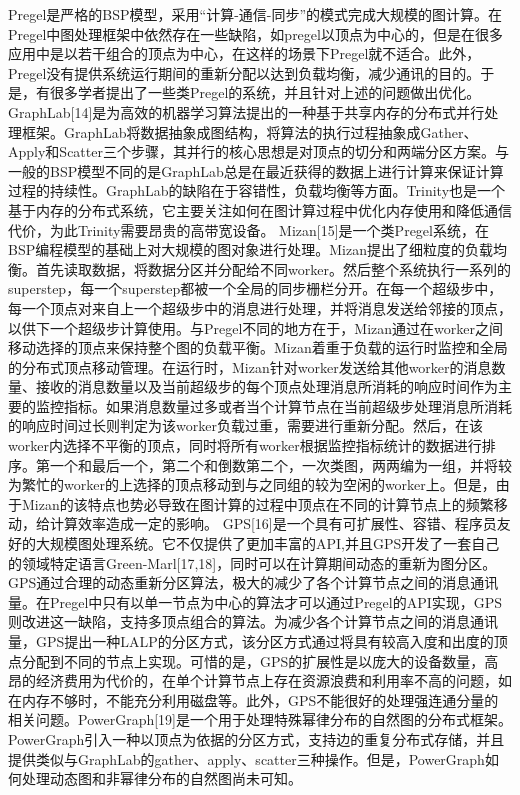Pregel是严格的BSP模型，采用“计算-通信-同步”的模式完成大规模的图计算。在Pregel中图处理框架中依然存在一些缺陷，如pregel以顶点为中心的，但是在很多应用中是以若干组合的顶点为中心，在这样的场景下Pregel就不适合。此外，Pregel没有提供系统运行期间的重新分配以达到负载均衡，减少通讯的目的。于是，有很多学者提出了一些类Pregel的系统，并且针对上述的问题做出优化。
GraphLab[14]是为高效的机器学习算法提出的一种基于共享内存的分布式并行处理框架。GraphLab将数据抽象成图结构，将算法的执行过程抽象成Gather、Apply和Scatter三个步骤，其并行的核心思想是对顶点的切分和两端分区方案。与一般的BSP模型不同的是GraphLab总是在最近获得的数据上进行计算来保证计算过程的持续性。GraphLab的缺陷在于容错性，负载均衡等方面。Trinity也是一个基于内存的分布式系统，它主要关注如何在图计算过程中优化内存使用和降低通信代价，为此Trinity需要昂贵的高带宽设备。
Mizan[15]是一个类Pregel系统，在BSP编程模型的基础上对大规模的图对象进行处理。Mizan提出了细粒度的负载均衡。首先读取数据，将数据分区并分配给不同worker。然后整个系统执行一系列的superstep，每一个superstep都被一个全局的同步栅栏分开。在每一个超级步中，每一个顶点对来自上一个超级步中的消息进行处理，并将消息发送给邻接的顶点，以供下一个超级步计算使用。与Pregel不同的地方在于，Mizan通过在worker之间移动选择的顶点来保持整个图的负载平衡。Mizan着重于负载的运行时监控和全局的分布式顶点移动管理。在运行时，Mizan针对worker发送给其他worker的消息数量、接收的消息数量以及当前超级步的每个顶点处理消息所消耗的响应时间作为主要的监控指标。如果消息数量过多或者当个计算节点在当前超级步处理消息所消耗的响应时间过长则判定为该worker负载过重，需要进行重新分配。然后，在该worker内选择不平衡的顶点，同时将所有worker根据监控指标统计的数据进行排序。第一个和最后一个，第二个和倒数第二个，一次类图，两两编为一组，并将较为繁忙的worker的上选择的顶点移动到与之同组的较为空闲的worker上。但是，由于Mizan的该特点也势必导致在图计算的过程中顶点在不同的计算节点上的频繁移动，给计算效率造成一定的影响。
GPS[16]是一个具有可扩展性、容错、程序员友好的大规模图处理系统。它不仅提供了更加丰富的API,并且GPS开发了一套自己的领域特定语言Green-Marl[17,18]，同时可以在计算期间动态的重新为图分区。GPS通过合理的动态重新分区算法，极大的减少了各个计算节点之间的消息通讯量。在Pregel中只有以单一节点为中心的算法才可以通过Pregel的API实现，GPS则改进这一缺陷，支持多顶点组合的算法。为减少各个计算节点之间的消息通讯量，GPS提出一种LALP的分区方式，该分区方式通过将具有较高入度和出度的顶点分配到不同的节点上实现。可惜的是，GPS的扩展性是以庞大的设备数量，高昂的经济费用为代价的，在单个计算节点上存在资源浪费和利用率不高的问题，如在内存不够时，不能充分利用磁盘等。此外，GPS不能很好的处理强连通分量的相关问题。PowerGraph[19]是一个用于处理特殊幂律分布的自然图的分布式框架。PowerGraph引入一种以顶点为依据的分区方式，支持边的重复分布式存储，并且提供类似与GraphLab的gather、apply、scatter三种操作。但是，PowerGraph如何处理动态图和非幂律分布的自然图尚未可知。
